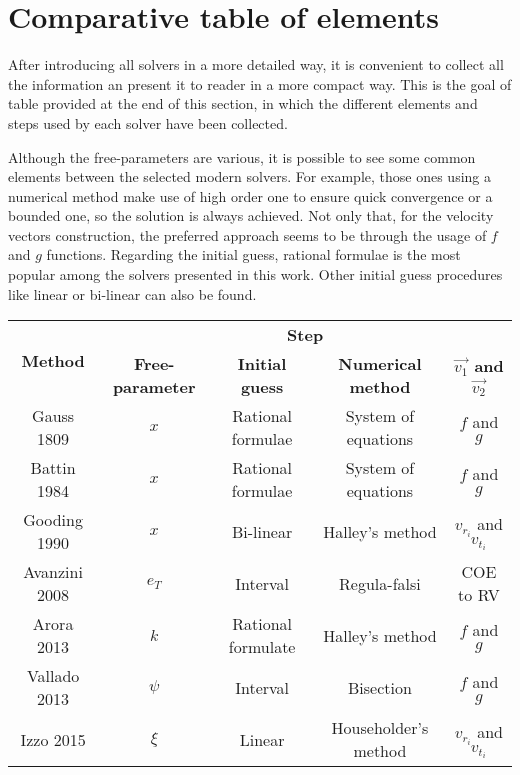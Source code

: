 \section{Comparative table of elements}

After introducing all solvers in a more detailed way, it is convenient to
collect all the information an present it to reader in a more compact way. This
is the goal of table provided at the end of this section, in which the different
elements and steps used by each solver have been collected.

Although the free-parameters are various, it is possible to see some common
elements between the selected modern solvers. For example, those ones using a
numerical method make use of high order one to ensure quick convergence or a
bounded one, so the solution is always achieved. Not only that, for the velocity
vectors construction, the preferred approach seems to be through the usage of
$f$ and $g$ functions. Regarding the initial guess, rational formulae is the
most popular among the solvers presented in this work. Other initial guess
procedures like linear or bi-linear can also be found.

\begin{table}[H]
\footnotesize
\centering
\begin{tabular}{|c|c|c|c|c|}
\hline
\multirow{2}{*}{\textbf{Method}} & \multicolumn{4}{c|}{\textbf{Step}}                                         \\ \cline{2-5}
 & \textbf{Free-parameter} & \textbf{Initial guess} & \textbf{Numerical method} & \textbf{$\vec{v_1}$ and $\vec{v_2}$} \\ \hline
Gauss 1809                       & $x$    & Rational formulae              & System of equations  & $f$ and $g$ \\ \hline
Battin 1984                      & $x$    & Rational formulae  & System of equations  & $f$ and $g$ \\ \hline
Gooding 1990                     & $x$    & Bi-linear          & Halley's method      & $v_{r_i}$ and $v_{t_i}$ \\ \hline
Avanzini 2008                    & $e_T$  & Interval           & Regula-falsi         & COE to RV             \\ \hline
Arora 2013                       & $k$    & Rational formulate & Halley's method      & $f$ and $g$ \\ \hline
Vallado 2013                     & $\psi$ & Interval           & Bisection            & $f$ and $g$ \\ \hline
Izzo 2015                        & $\xi$  & Linear             & Householder's method & $v_{r_i}$ and $v_{t_i}$ \\ \hline
\end{tabular}
\end{table}
